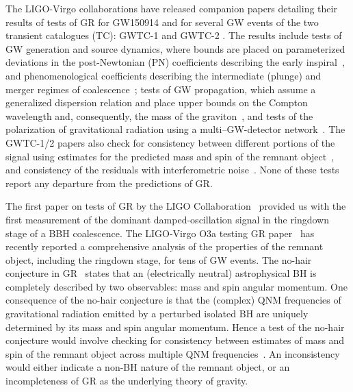 The LIGO-Virgo collaborations have released companion papers \cite{} detailing their results
of tests of GR for GW150914 \cite{} and for several GW events of
the two transient catalogues (TC): GWTC-1\cite{}  and GWTC-2 \cite{}.
The results include tests of GW generation and source dynamics, where bounds are placed on
parameterized deviations in the post-Newtonian (PN) coefficients describing
the early inspiral~\citep{earlydevelopmentpapers}, and
phenomenological coefficients describing the intermediate (plunge) and
merger regimes of coalescence~\citep{TIGERmethodspapers}; tests of GW
propagation, which assume a generalized dispersion relation and place
upper bounds on the Compton wavelength and, consequently, the mass of
the graviton~\citep{gw170104,samajdar2017projected}, and tests of the
polarization of gravitational radiation using a
multi--GW-detector network~\citep{gw170814,isi2017probing}. The GWTC-1/2 papers also
check for consistency between different portions of the signal using estimates for the predicted mass and spin of the remnant
object~\citep{Ghosh:2016xx,Ghosh:2017gfp,LSC_2016grtests}, and
consistency of the residuals with interferometric
noise~\citep{Ghonge:2020suv,gwtc1_tgr}. None of these tests report any
departure from the predictions of GR.

The first paper on tests of GR by the LIGO Collaboration~\cite{} provided us with the
first measurement of the dominant damped-oscillation signal in the ringdown stage of a BBH
coalescence. The LIGO-Virgo O3a testing GR paper~\cite{} has recently reported a comprehensive analysis of the properties of the remnant object, including the ringdown stage, for tens of GW events.
The no-hair conjecture in GR~\citep{} states that an (electrically neutral) astrophysical BH is completely
described by two observables: mass and spin angular momentum. One
consequence of the no-hair conjecture is that the (complex) QNM
frequencies of gravitational radiation emitted by a perturbed isolated
BH are uniquely determined by its mass and spin angular momentum. Hence
a test of the no-hair conjecture would involve checking for
consistency between estimates of mass and spin of the remnant object
across multiple QNM frequencies~\cite{Dreyer:2003bv}. An inconsistency would either
indicate a non-BH nature of the remnant object, or an incompleteness
of GR as the underlying theory of gravity.

